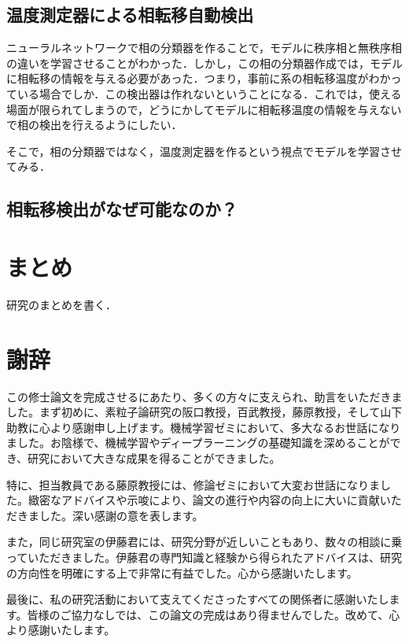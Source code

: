 \documentclass[a4paper,11pt]{jsreport}
\begin{document}
\section{温度測定器による相転移自動検出}
ニューラルネットワークで相の分類器を作ることで，モデルに秩序相と無秩序相の違いを学習させることがわかった．しかし，この相の分類器作成では，モデルに相転移の情報を与える必要があった．つまり，事前に系の相転移温度がわかっている場合でしか．この検出器は作れないということになる．これでは，使える場面が限られてしまうので，どうにかしてモデルに相転移温度の情報を与えないで相の検出を行えるようにしたい．\par
そこで，相の分類器ではなく，温度測定器を作るという視点でモデルを学習させてみる．

\section{相転移検出がなぜ可能なのか？}



\chapter*{まとめ}
研究のまとめを書く．

\chapter*{謝辞} %
この修士論文を完成させるにあたり、多くの方々に支えられ、助言をいただきました。まず初めに、素粒子論研究の阪口教授，百武教授，藤原教授，そして山下助教に心より感謝申し上げます。機械学習ゼミにおいて、多大なるお世話になりました。お陰様で、機械学習やディープラーニングの基礎知識を深めることができ、研究において大きな成果を得ることができました。\par
特に、担当教員である藤原教授には、修論ゼミにおいて大変お世話になりました。緻密なアドバイスや示唆により、論文の進行や内容の向上に大いに貢献いただきました。深い感謝の意を表します。\par
また，同じ研究室の伊藤君には、研究分野が近しいこともあり、数々の相談に乗っていただきました。伊藤君の専門知識と経験から得られたアドバイスは、研究の方向性を明確にする上で非常に有益でした。心から感謝いたします。\par
最後に、私の研究活動において支えてくださったすべての関係者に感謝いたします。皆様のご協力なしでは、この論文の完成はあり得ませんでした。改めて、心より感謝いたします。
\end{document}

